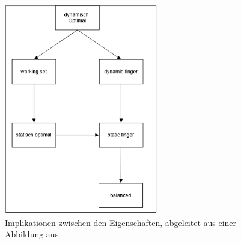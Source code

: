 \documentclass[a4paper,12pt]{article}
\begin{document}
\begin{figure}[h]
	\centering
	\includegraphics[width= 0.6\textwidth]{"Medien/DynOpt/upperBounds"}
	\caption{Implikationen zwischen den Eigenschaften, abgeleitet aus einer Abbildung aus \cite{upperBounds} }
	\label{fig:upperBounds}
\end{figure}


\newpage


\end{document}
